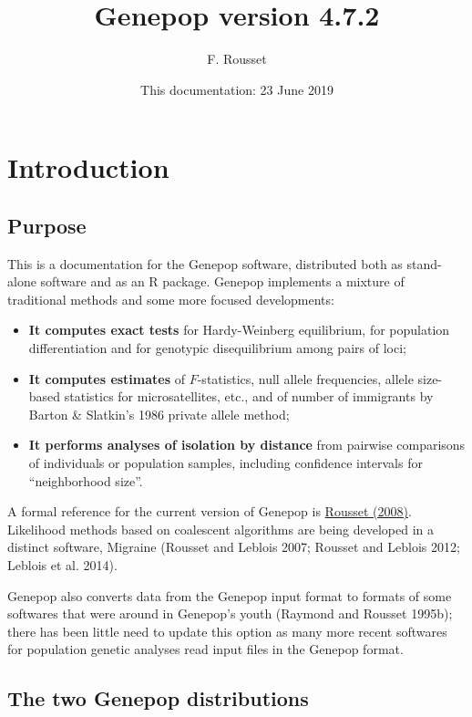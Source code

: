 \documentclass[12pt,]{book}
\title{Genepop version 4.7.2}
\author{F. Rousset}
\date{This documentation: 23 June 2019}
\begin{document}
\maketitle

{
\setcounter{tocdepth}{1}
\tableofcontents
}
\chapter{Introduction}\label{introduction}

\section{Purpose}\label{purpose}

This is a documentation for the Genepop software, distributed both as
stand-alone software and as an R package. Genepop implements a mixture
of traditional methods and some more focused developments:

\begin{itemize}
\item
  \textbf{It computes exact tests} for Hardy-Weinberg equilibrium, for
  population differentiation and for genotypic disequilibrium among
  pairs of loci;
\item
  \textbf{It computes estimates} of \(F\)-statistics, null allele
  frequencies, allele size-based statistics for microsatellites, etc.,
  and of number of immigrants by Barton \& Slatkin's 1986 private allele
  method;
\item
  \textbf{It performs analyses of isolation by distance} from pairwise
  comparisons of individuals or population samples, including confidence
  intervals for ``neighborhood size''.
\end{itemize}

A formal reference for the current version of Genepop is
\href{http://dx.doi.org/10.1111/j.1471-8286.2007.01931.x}{Rousset
(2008)}. Likelihood methods based on coalescent algorithms are being
developed in a distinct software, Migraine (Rousset and Leblois 2007;
Rousset and Leblois 2012; Leblois et al. 2014).

Genepop also converts data from the Genepop input format to formats of
some softwares that were around in Genepop's youth (Raymond and Rousset
1995b); there has been little need to update this option as many more
recent softwares for population genetic analyses read input files in the
Genepop format.

\section{The two Genepop
distributions}\label{the-two-genepop-distributions}
\end{document}
